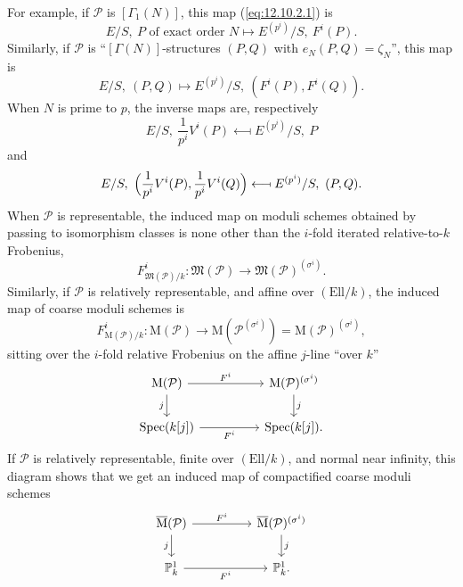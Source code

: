 For example, if $\mathcal{P}$ is $[\Gamma_1(N)]$, this map (\ref{eq:12.10.2.1}) is
\[
E/S,\ P \text{ of exact order } N \longmapsto E^{(p^i)}/S,\ F^i(P) .
\]
Similarly, if $\mathcal{P}$ is ``$[\Gamma(N)]$-structures $(P, Q)$ with $e_N(P, Q) = \zeta_N$'', this map is
\[
E/S,\ (P, Q) \longmapsto E^{(p^i)}/S,\ (F^i(P), F^i(Q)) .
\]
When $N$ is prime to $p$, the inverse maps are, respectively
\[
E/S,\ \frac{1}{p^i} V^i(P) \longmapsfrom E^{(p^i)}/S,\ P
\]
and
\[
E/S,\ \Bigl(\frac{1}{p^i} V^i(P), \frac{1}{p^i} V^i(Q)\Bigr) \longmapsfrom E^{(p^i)}/S,\ (P, Q) .
\]
When $\mathcal{P}$ is representable, the induced map on moduli schemes obtained by passing to isomorphism classes is none other than the $i$-fold iterated relative-to-$k$ Frobenius,
\[
F^i_{\mathfrak{M}(\mathcal{P})/k} : \mathfrak{M}(\mathcal{P}) \to \mathfrak{M}(\mathcal{P})^{(\sigma^i)} .
\]
Similarly, if $\mathcal{P}$ is relatively representable, and affine over $(\mathrm{Ell}/k)$, the induced map of coarse moduli schemes is
\[
F^i_{\mathrm{M}(\mathcal{P})/k} : \mathrm{M}(\mathcal{P}) \to \mathrm{M}(\mathcal{P}^{(\sigma^i)}) = \mathrm{M}(\mathcal{P})^{(\sigma^i)} ,
\]
sitting over the $i$-fold relative Frobenius on the affine $j$-line ``over $k$''
\[
\begin{tikzcd}[row sep=1.8em, column sep=huge]
\mathrm{M}(\mathcal{P}) \arrow[r, "F^i"] \arrow[d, "j"'] & \mathrm{M}(\mathcal{P})^{(\sigma^i)} \arrow[d, "j"] \\
\Spec(k[j]) \arrow[r, "F^i"'] & \Spec(k[j]) .
\end{tikzcd}
\]
If $\mathcal{P}$ is relatively representable, finite over $(\mathrm{Ell}/k)$, and normal near infinity, this diagram shows that we get an induced map of compactified coarse moduli schemes
\[
\begin{tikzcd}[row sep=1.8em, column sep=huge]
\overline{\mathrm{M}}(\mathcal{P}) \arrow[r, "F^i"] \arrow[d, "j"'] & \overline{\mathrm{M}}(\mathcal{P})^{(\sigma^i)} \arrow[d, "j"] \\
\mathbb{P}^1_k \arrow[r, "F^i"'] & \mathbb{P}^1_k .
\end{tikzcd}
\]

